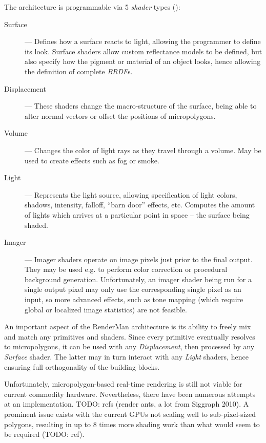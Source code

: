 The architecture is programmable via 5 \emph{shader} types (\cite{keyframeRSL1}):

\begin{description}
\item[Surface] --- Defines how a surface reacts to light, allowing the programmer to define its look. Surface shaders allow custom reflectance models to be defined, but also specify how the pigment or material of an object looks, hence allowing the definition of complete \emph{BRDF}s.
\item[Displacement] --- These shaders change the macro-structure of the surface, being able to alter normal vectors or offset the positions of micropolygons.
\item[Volume] --- Changes the color of light rays as they travel through a volume. May be used to create effects such as fog or smoke.
\item[Light] --- Represents the light source, allowing specification of light colors, shadows, intensity, falloff, ``barn door'' effects, etc. Computes the amount of lights which arrives at a particular point in space -- the surface being shaded.
\item[Imager] --- Imager shaders operate on image pixels just prior to the final output. They may be used e.g. to perform color correction or procedural background generation. Unfortunately, an imager shader being run for a single output pixel may only use the corresponding single pixel as an input, so more advanced effects, such as tone mapping (which require global or localized image statistics) are not feasible.
\end{description}

An important aspect of the RenderMan architecture is its ability to freely mix and match any primitives and shaders. Since every primitive eventually resolves to micropolygons, it can be used with any \emph{Displacement}, then processed by any \emph{Surface} shader. The latter may in turn interact with any \emph{Light} shaders, hence ensuring full orthogonality of the building blocks.

Unfortunately, micropolygon-based real-time rendering is still not viable for current commodity hardware. Nevertheless, there have been numerous attempts at an implementation. TODO: refs (render ants, a lot from Siggraph 2010). A prominent issue exists with the current GPUs not scaling well to sub-pixel-sized polygons, resulting in up to 8 times more shading work than what would seem to be required (TODO: ref).

